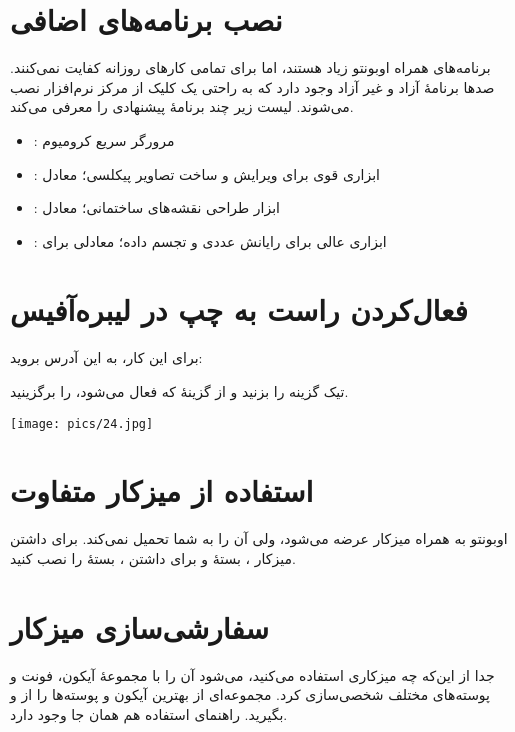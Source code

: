 \section{نصب برنامه‌های اضافی}
برنامه‌های همراه اوبونتو زیاد هستند، اما برای تمامی کارهای روزانه کفایت نمی‌کنند. صدها برنامهٔ آزاد و غیر آزاد وجود دارد که به راحتی یک کلیک از مرکز نرم‌افزار نصب می‌شوند. لیست زیر چند برنامهٔ پیشنهادی را معرفی می‌کند.
\begin{itemize}
\item {}: مرورگر سریع کرومیوم
\item {}: ابزاری قوی برای ویرایش و ساخت تصاویر پیکلسی؛ معادل 
\item {}: ابزار طراحی نقشه‌های ساختمانی؛ معادل 
\item {}: ابزاری عالی برای رایانش عددی و تجسم داده؛ معادلی برای 
\end{itemize}

\section{فعال‌کردن راست به چپ در لیبره‌آفیس}
برای این کار، به این آدرس بروید:\\
\begin{flushleft}
\end{flushleft}
تیک گزینه  را بزنید و از گزینهٔ  که فعال می‌شود،  را برگزینید.

\begin{center}
\texttt{[image: pics/24.jpg]}
\end{center}

\section{استفاده از میزکار متفاوت}
اوبونتو به همراه میزکار  عرضه می‌شود، ولی آن را به شما تحمیل نمی‌کند. برای داشتن میزکار ، بستهٔ  و برای داشتن ، بستهٔ  را نصب کنید.

\section{سفارشی‌سازی میزکار}
جدا از این‌که چه میزکاری استفاده می‌کنید، می‌شود آن را با مجموعهٔ آیکون، فونت و پوسته‌های مختلف شخصی‌سازی کرد. مجموعه‌ای از بهترین آیکون و پوسته‌ها را از  و  بگیرید. راهنمای استفاده هم همان جا وجود دارد.

